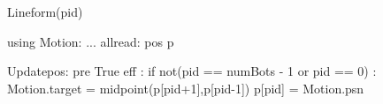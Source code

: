 Lineform(pid)

using Motion:
...
allread:
  pos p$\label{lineformp}$

Updatepos:
  pre True
  eff :
     if not(pid == numBots - 1 or pid == 0) :
        Motion.target = midpoint(p[pid+1],p[pid-1])
    p[pid] = Motion.psn

